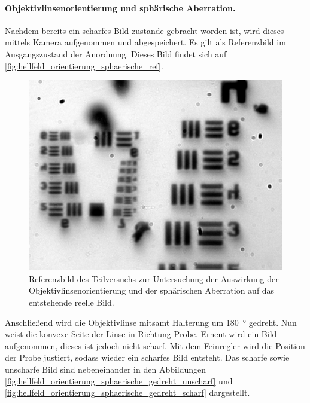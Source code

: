 \documentclass[english, ngerman]{scrartcl}
\begin{document}
\paragraph{Objektivlinsenorientierung und sphärische Aberration.}
Nachdem bereits ein scharfes Bild zustande gebracht worden ist, wird dieses mittels Kamera aufgenommen und abgespeichert. Es gilt als Referenzbild im Ausgangszustand der Anordnung. Dieses Bild findet sich auf \autoref{fig:hellfeld_orientierung_sphaerische_ref}.
%
\begin{figure}[H]
    \centering
    \begin{samepage}
        \includegraphics[width=0.475\linewidth]{fig/Versuch3/hellfeld_3.1_vorher.jpg}
        \caption[Hellfeld Orientierung und sphärische Aberration]{Referenzbild des Teilversuchs zur Untersuchung der Auswirkung der Objektivlinsenorientierung und der sphärischen Aberration auf das entstehende reelle Bild.}
        \label{fig:hellfeld_orientierung_sphaerische_ref}
    \end{samepage}
\end{figure}
%
Anschließend wird die Objektivlinse mitsamt Halterung um \SI{180}{\degree} gedreht. Nun weist die konvexe Seite der Linse in Richtung Probe. Erneut wird ein Bild aufgenommen, dieses ist jedoch nicht scharf. Mit dem Feinregler wird die Position der Probe justiert, sodass wieder ein scharfes Bild entsteht. Das scharfe sowie unscharfe Bild sind nebeneinander in den Abbildungen \ref{fig:hellfeld_orientierung_sphaerische_gedreht_unscharf} und \ref{fig:hellfeld_orientierung_sphaerische_gedreht_scharf} dargestellt.
%
\setcapindent{0pt}
\end{document}
